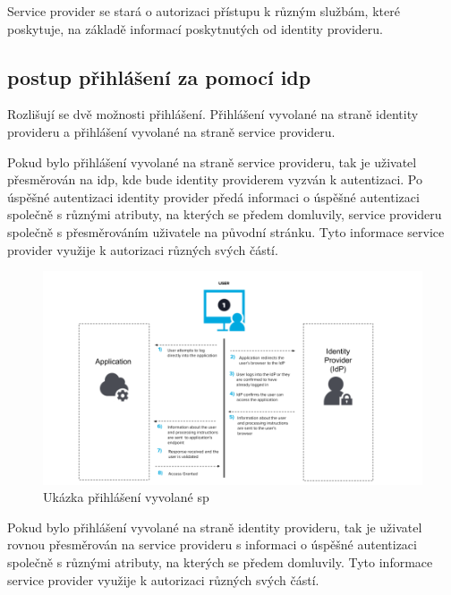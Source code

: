 Service provider se stará o autorizaci přístupu k různým službám, které poskytuje, na základě informací poskytnutých od identity provideru.

\subsection{postup přihlášení za pomocí idp}

Rozlišují se dvě možnosti přihlášení. Přihlášení vyvolané na straně identity provideru a přihlášení vyvolané na straně service provideru.


Pokud bylo přihlášení vyvolané na straně service provideru, tak je uživatel přesměrován na idp, kde bude identity providerem vyzván k autentizaci.
Po úspěšné autentizaci identity provider předá informaci o úspěšné autentizaci společně s různými atributy, na kterých se předem domluvily, service provideru společně s přesměrováním uživatele na původní stránku.
Tyto informace service provider využije k autorizaci různých svých částí.\cite{SAMLxOIDC}
\begin{figure}[bp]
	\centering
    \includegraphics[width=1.2\textwidth]{obrazky-figures/saml-sp.png}
	\caption{Ukázka přihlášení vyvolané sp\cite{SAMLxOIDC}}
	\label{saml-flow}
\end{figure}

Pokud bylo přihlášení vyvolané na straně identity provideru, tak je uživatel rovnou přesměrován na service provideru s informaci o úspěšné autentizaci společně s různými atributy, na kterých se předem domluvily.
Tyto informace service provider využije k autorizaci různých svých částí.\cite{SAMLxOIDC}

